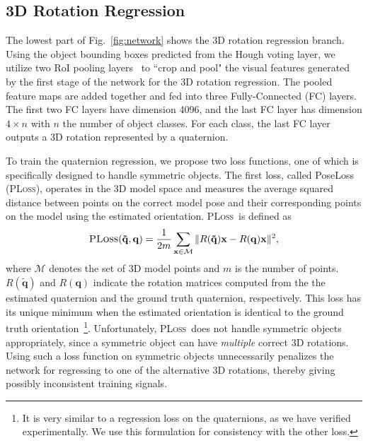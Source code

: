 \documentclass[conference]{IEEEtran}
\newcommand{\pl}{\textsc{PLoss}}
\begin{document}
\subsection{3D Rotation Regression}

The lowest part of Fig.~\ref{fig:network} shows the 3D rotation regression branch. Using the object bounding boxes predicted from the Hough voting layer, we utilize two RoI pooling layers~\cite{girshick2015fast} to ``crop and pool" the visual features generated by the first stage of the network for the 3D rotation regression. The pooled feature maps are added together and fed into three Fully-Connected (FC) layers. The first two FC layers have dimension 4096, and the last FC layer has dimension $4 \times n$ with $n$ the number of object classes. For each class, the last FC layer outputs a 3D rotation represented by a quaternion.

To train the quaternion regression, we propose two loss functions, one of which is specifically designed to handle symmetric objects.  The first loss, called PoseLoss (\pl), operates in the 3D model space and measures the average squared distance between points on the correct model pose and their corresponding points on the model using the estimated orientation. \pl\ is defined as
\begin{equation}
\text{\pl}(\mathbf{\tilde{q}}, \mathbf{q}) = \frac{1}{2m}\sum_{\mathbf{x} \in \mathcal{M}}\| R(\mathbf{\tilde{q}}) \mathbf{x} -  R(\mathbf{q})\mathbf{x}  \|^2,
\end{equation}
where $\mathcal{M}$ denotes the set of 3D model points and $m$ is the number of points. $R(\mathbf{\tilde{q}})$ and $R(\mathbf{q})$ indicate the rotation matrices computed from the the estimated quaternion and the ground truth quaternion, respectively. This loss has its unique minimum when the estimated orientation is identical to the ground truth orientation~\footnote{It is very similar to a regression loss on the quaternions, as we have verified experimentally. We use this formulation for consistency with the other loss.}.  Unfortunately, \pl\ does not handle symmetric objects appropriately, since a symmetric object can have \emph{multiple} correct 3D rotations. Using such a loss function on symmetric objects unnecessarily penalizes the network for regressing to one of the alternative 3D rotations, thereby giving possibly inconsistent training signals.
\end{document}
